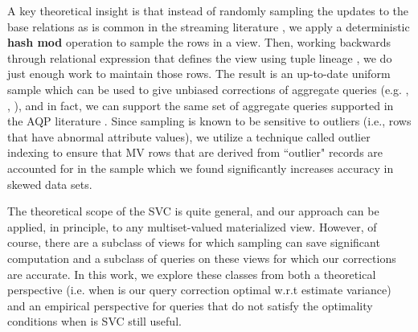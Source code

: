 A key theoretical insight is that instead of randomly sampling the updates to the base relations as is common in the streaming literature \cite{babcock2002sampling, DBLP:journals/pvldb/MankuM12}, we apply a deterministic \textbf{hash mod} operation to sample the rows in a view.
Then, working backwards through relational expression that defines the view using tuple lineage \cite{DBLP:journals/vldb/CuiW03}, we do just enough work to maintain those rows.
The result is an up-to-date uniform sample which can be used to give unbiased corrections of aggregate queries (e.g. \sumfunc, \countfunc, \avgfunc), and in fact, we can support the same set of aggregate queries supported in the AQP literature \cite{AgarwalMPMMS13, agarwalknowing}.
Since sampling is known to be sensitive to outliers (i.e., rows that have abnormal attribute values), we
utilize a technique called outlier indexing \cite{chaudhuri2001overcoming} to ensure that MV rows that are derived from ``outlier" records are accounted for in the sample which we found significantly increases accuracy in skewed data sets.

The theoretical scope of the SVC is quite general, and our approach can be applied, in principle, to any multiset-valued materialized view.
However, of course, there are a subclass of views for which sampling can save significant computation and a subclass of queries on these views for which our corrections are accurate.
In this work, we explore these classes from both a theoretical perspective (i.e. when is our query correction optimal w.r.t estimate variance) and an empirical perspective for queries that do not satisfy the optimality conditions when is SVC still useful.


